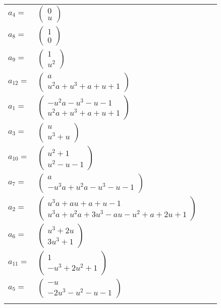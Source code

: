 \documentclass[1p]{elsarticle_modified}
\theoremstyle{definition}
\begin{document}
\begin{tabular}{m{7pt} m{180pt} m{7pt} m{180pt} }
\flushright $a_{4}=$&$\begin{pmatrix}0\\u\end{pmatrix}$ \\
\flushright $a_{8}=$&$\begin{pmatrix}1\\0\end{pmatrix}$ \\
\flushright $a_{9}=$&$\begin{pmatrix}1\\u^2\end{pmatrix}$ \\
\flushright $a_{12}=$&$\begin{pmatrix}a\\u^2 a+u^3+a+u+1\end{pmatrix}$ \\
\flushright $a_{1}=$&$\begin{pmatrix}- u^2 a- u^3- u-1\\u^2 a+u^3+a+u+1\end{pmatrix}$ \\
\flushright $a_{3}=$&$\begin{pmatrix}u\\u^3+u\end{pmatrix}$ \\
\flushright $a_{10}=$&$\begin{pmatrix}u^2+1\\u^2- u-1\end{pmatrix}$ \\
\flushright $a_{7}=$&$\begin{pmatrix}a\\- u^3 a+u^2 a- u^3- u-1\end{pmatrix}$ \\
\flushright $a_{2}=$&$\begin{pmatrix}u^3 a+a u+a+u-1\\u^3 a+u^2 a+3 u^3- a u- u^2+a+2 u+1\end{pmatrix}$ \\
\flushright $a_{6}=$&$\begin{pmatrix}u^3+2 u\\3 u^3+1\end{pmatrix}$ \\
\flushright $a_{11}=$&$\begin{pmatrix}1\\- u^3+2 u^2+1\end{pmatrix}$ \\
\flushright $a_{5}=$&$\begin{pmatrix}- u\\-2 u^3- u^2- u-1\end{pmatrix}$\\&\end{tabular}
\end{document}
